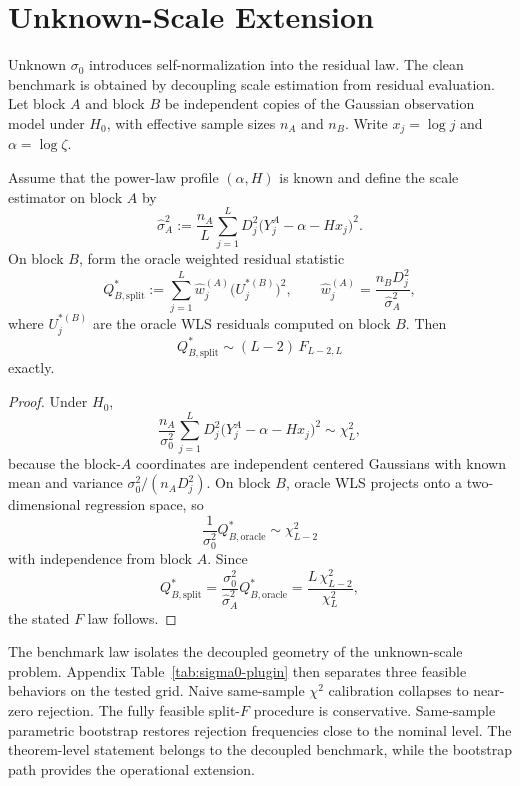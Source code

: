 \section{Unknown-Scale Extension}
\label{sec:application}

Unknown $\sigma_0$ introduces self-normalization into the residual law. The
clean benchmark is obtained by decoupling scale estimation from residual
evaluation. Let block $A$ and block $B$ be independent copies of the Gaussian
observation model under $H_0$, with effective sample sizes $n_A$ and $n_B$.
Write $x_j = \log j$ and $\alpha = \log \zeta$.

\begin{proposition}
\label{prop:oracle-split-f}
Assume that the power-law profile $(\alpha,H)$ is known and define the scale
estimator on block $A$ by
\[
    \hat\sigma_{A}^{2}
    :=
    \frac{n_A}{L}
    \sum_{j=1}^{L} D_j^2\bigl(Y^{A}_{j} - \alpha - Hx_j\bigr)^2.
\]
On block $B$, form the oracle weighted residual statistic
\[
    Q_{B,\mathrm{split}}^*
    :=
    \sum_{j=1}^{L} \hat w^{(A)}_j \bigl(U^{*(B)}_j\bigr)^2,
    \qquad
    \hat w^{(A)}_j = \frac{n_B D_j^2}{\hat\sigma_A^2},
\]
where $U^{*(B)}_j$ are the oracle WLS residuals computed on block $B$.
Then
\[
    Q_{B,\mathrm{split}}^* \sim (L-2)\,F_{L-2,L}
\]
exactly.
\end{proposition}

\begin{proof}
Under $H_0$,
\[
    \frac{n_A}{\sigma_0^2}
    \sum_{j=1}^{L} D_j^2\bigl(Y^{A}_{j} - \alpha - Hx_j\bigr)^2
    \sim \chi^2_L,
\]
because the block-$A$ coordinates are independent centered Gaussians with known
mean and variance $\sigma_0^2/(n_A D_j^2)$. On block $B$, oracle WLS projects
onto a two-dimensional regression space, so
\[
    \frac{1}{\sigma_0^2} Q_{B,\mathrm{oracle}}^* \sim \chi^2_{L-2}
\]
with independence from block $A$. Since
\[
    Q_{B,\mathrm{split}}^*
    =
    \frac{\sigma_0^2}{\hat\sigma_A^2} Q_{B,\mathrm{oracle}}^*
    =
    \frac{L\,\chi^2_{L-2}}{\chi^2_L},
\]
the stated $F$ law follows.
\end{proof}

The benchmark law isolates the decoupled geometry of the unknown-scale problem.
Appendix Table~\ref{tab:sigma0-plugin} then separates three feasible behaviors
on the tested grid. Naive same-sample $\chi^2$ calibration collapses to
near-zero rejection. The fully feasible split-$F$ procedure is conservative.
Same-sample parametric bootstrap restores rejection frequencies close to the
nominal level. The theorem-level statement belongs to the decoupled benchmark,
while the bootstrap path provides the operational extension.
